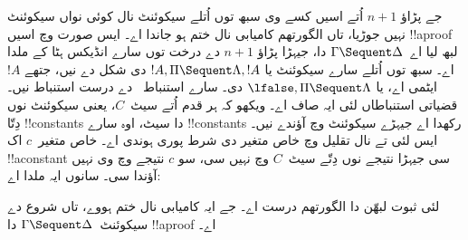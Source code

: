 \documentclass[../../../include/open-logic-section]{subfiles}
\begin{document}
جے پڑاؤ $n+1$ اُتے اسیں کسے وی سبھ توں اُتلے سیکوئنٹ نال کوئی نواں سیکوئنٹ نہیں جوڑیا، تاں الگورتھم کامیابی نال ختم ہو جاندا اے۔ ایس صورت وچ اسیں !!a{proof} لبھ لیا اے~$\Gamma \Sequent \Delta$ دا، جیہڑا پڑاؤ $n+1$ دے درخت توں سارے انڈیکس ہٹا کے ملدا اے۔ سبھ توں اُتلے سارے سیکوئنٹ یا $!A, \Pi \Sequent \Lambda, !A$ دی شکل دے نیں، جتھے $!A$ ایٹمی اے، یا $\lfalse, \Pi
\Sequent \Lambda$ دی۔ سارے استنباط~ دے درست استنباط نیں۔ قضیاتی استنباطاں لئی ایہ صاف اے۔ ویکھو کہ ہر قدم اُتے سیٹ~$C$، یعنی سیکوئنٹ نوں دِتّا !!{constant}s دا سیٹ، اوہ سارے !!{constant}s رکھدا اے جیہڑے سیکوئنٹ وچ آؤندے نیں۔ ایس لئی \LeftR{\lexists} تے \RightR{\lforall} نال تقلیل وچ خاص متغیر دی شرط پوری ہوندی اے۔ خاص متغیر~$c$ اک !!a{constant} سی جیہڑا نتیجے نوں دِتّے سیٹ~$C$ وچ نہیں سی، سو $c$ نتیجے وچ وی نہیں آؤندا سی۔ سانوں ایہ ملدا اے:

\begin{prop}
 لئی ثبوت لبھّن دا الگورتھم درست اے۔ جے ایہ کامیابی نال ختم ہووے، تاں شروع دے سیکوئنٹ~$\Gamma \Sequent \Delta$ دا !!a{proof} اے۔
\end{prop}
\end{document}

